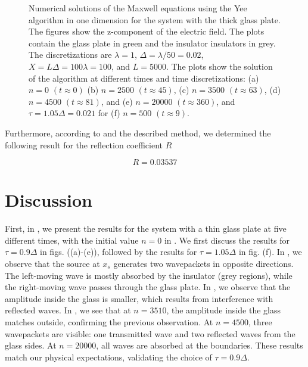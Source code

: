 \documentclass[11pt, A4paper]{article}
\begin{document}
\begin{figure}[h!]
\begin{subfigure}[h]{0.499\textwidth}
         \caption{}
         \label{fig: thick_t10_tau105}
     \end{subfigure}
\caption{Numerical solutions of the Maxwell equations using the Yee algorithm in one dimension for the system with the thick glass plate. The figures show the z-component of the electric field. The plots contain the glass plate in green and the insulator insulators in grey. The discretizations are $\lambda=1$, $\Delta=\lambda/50=0.02$, $X=L\Delta=100 \lambda=100$, and $L=5000$. The plots show the solution of the algorithm at different times and time discretizations: (a) $n=0$ $(t\approx 0)$ (b) $n=2500$ $(t\approx 45)$, (c) $n=3500$ $(t\approx 63)$, (d) $n=4500$ $(t\approx 81)$, and (e) $n=20000$ $(t\approx360)$, and $\tau=1.05 \Delta=0.021$ for (f) $n=500$ $(t\approx 9)$.}
\label{fig: Maxwell_thick}
\end{figure}

Furthermore, according to  and the described method, we determined the following result for the reflection coefficient $R$

\begin{equation}
    R = 0.03537
\end{equation}

\clearpage
\section{Discussion}
First, in , we present the results for the system with a thin glass plate at five different times, with the initial value $n=0$ in . We first discuss the results for $\tau = 0.9 \Delta$ in figs. ((a)-(e)), followed by the results for $\tau = 1.05 \Delta$ in fig. (f). In , we observe that the source at $x_s$ generates two wavepackets in opposite directions. The left-moving wave is mostly absorbed by the insulator (grey regions), while the right-moving wave passes through the glass plate. In , we observe that the amplitude inside the glass is smaller, which results from interference with reflected waves. In , we see that at $n=3510$, the amplitude inside the glass matches outside, confirming the previous observation. At $n=4500$, three wavepackets are visible: one transmitted wave and two reflected waves from the glass sides. At $n=20000$, all waves are absorbed at the boundaries. These results match our physical expectations, validating the choice of $\tau = 0.9 \Delta$.
\end{document}
